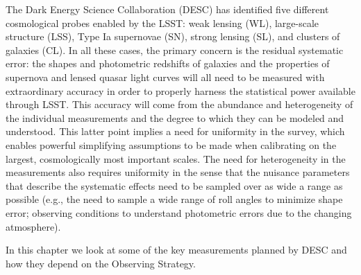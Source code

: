 The  Dark Energy Science Collaboration (DESC) has identified five
different cosmological probes enabled by the LSST: weak lensing (WL),
large-scale structure (LSS), Type Ia supernovae (SN), strong lensing
(SL), and clusters of galaxies (CL). In all these cases, the primary concern
is the residual systematic error: the shapes and photometric redshifts of
galaxies and the properties of supernova and lensed quasar light
curves will all need to be measured with extraordinary accuracy in
order to properly harness the statistical power available through LSST. This
accuracy will come from the abundance and heterogeneity of the
individual measurements and the degree to which they can be
modeled and understood. This latter point implies a need for uniformity
in the survey, which enables powerful simplifying assumptions to be made
when calibrating on the largest, cosmologically most important scales.
The need for heterogeneity in the measurements also requires uniformity in
the sense that the nuisance parameters that describe the systematic effects
need to be sampled over as wide a range as possible (e.g., the need to
sample a wide range of roll angles to minimize shape error;
observing conditions to understand photometric errors due to the
changing atmosphere).

In this chapter we look at some of the key measurements planned by DESC
and how they depend on the Observing Strategy.

















